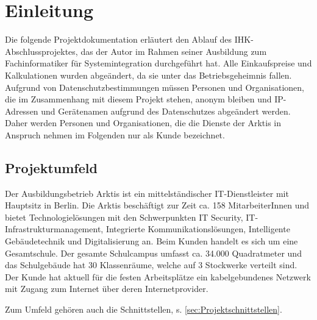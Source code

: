 \newpage
\section{Einleitung}
\label{sec:Einleitung}
Die folgende Projektdokumentation erläutert den Ablauf des IHK-Abschlussprojektes, das der Autor im Rahmen seiner Ausbildung zum Fachinformatiker für Systemintegration durchgeführt hat. 
Alle Einkaufspreise und Kalkulationen wurden abgeändert, da sie unter das Betriebsgeheimnis fallen. 
Aufgrund von Datenschutzbestimmungen müssen Personen und Organisationen, die im Zusammenhang mit diesem Projekt stehen, anonym bleiben und IP-Adressen und Gerätenamen aufgrund des Datenschutzes abgeändert werden. 
 Daher werden Personen und Organisationen, die die Dienste der \ac{Arktis} in Anspruch nehmen im Folgenden nur als Kunde bezeichnet. 

\subsection{Projektumfeld} 
\label{sec:Projektumfeld}
Der Ausbildungsbetrieb \acs{Arktis} ist ein mittelständischer IT-Dienstleister mit Hauptsitz in Berlin. Die \ac{Arktis} beschäftigt zur Zeit ca. 158 MitarbeiterInnen und bietet Technologielösungen mit den Schwerpunkten IT Security, IT-Infrastrukturmanagement, Integrierte Kommunikationslösungen, Intelligente Gebäudetechnik und Digitalisierung an. Beim Kunden handelt es sich um eine Gesamtschule. Der gesamte Schulcampus umfasst ca. 34.000 Quadratmeter und das Schulgebäude hat 30 Klassenräume, welche auf 3 Stockwerke verteilt sind. Der Kunde hat aktuell für die festen Arbeitsplätze ein kabelgebundenes Netzwerk mit Zugang zum Internet über deren Internetprovider.   

Zum Umfeld gehören auch die Schnittstellen, s. \ref{sec:Projektschnittstellen}.

